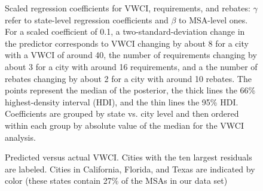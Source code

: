 \documentclass[draft,linenumbers]{agujournal}
\begin{document}
\begin{figure}[h]
\caption{Scaled regression coefficients for VWCI, requirements, and rebates: $\gamma$ refer to state-level regression coefficients and $\beta$ to MSA-level ones.
For a scaled coefficient of 0.1, a two-standard-deviation change in the predictor corresponds to VWCI changing by about 8 for a city with a VWCI of around 40, the number of requirements changing by about 3 for a city with around 16 requirements, and a the number of rebates changing by about 2 for a city with around 10 rebates. The points represent the median of the posterior, the thick lines the 66\% highest-density interval (HDI), and the thin lines the 95\% HDI. Coefficients are grouped by state vs. city level and then ordered within each group by absolute value of the median for the VWCI analysis.}\label{fig:vwci_cat_plot}
\end{figure}


\begin{figure}[h]
\caption{Predicted versus actual VWCI. Cities with the ten largest residuals are labeled. Cities in California, Florida, and Texas are indicated by color (these states contain 27\% of the MSAs in our data set)}\label{fig:vwci_residuals}
\end{figure}

\clearpage
\listofchanges
\end{document}
